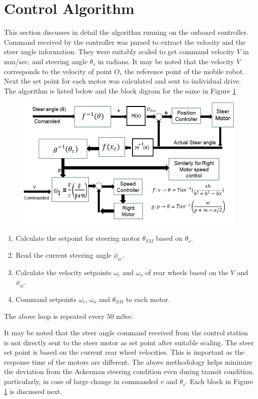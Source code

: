 \section{Control Algorithm }
This section discusses in detail the algorithm running on the onboard controller.  Command received by the controller was parsed to extract the velocity  and the steer angle  information. They were suitably scaled to get command velocity  $V$ in mm/sec, and steering  angle $\theta_s$ in radians.  It may be noted that the velocity $V$ corresponds to the velocity of point $O_r$ the reference point of the mobile robot.  Next the set point for each motor was calculated  and sent to individual drive. The algorithm is listed below and the block digram for the same in Figure \ref{fig:ControlBlock}
\begin{figure}[h]
	\includegraphics[width=\linewidth,keepaspectratio]{Chapter5/fig/BlkDigLocal2}
	\label{fig:ControlBlock} 
\end{figure}

\begin{enumerate}
	\item Calculate the setpoint for steering motor $\theta_{SM} $ based on $\theta_s$.
	\item Read the current steering  angle $\phi_{ic}$.
	\item Calculate the velocity setpoints $\omega_{i}$ and $\omega_{o}$ of  rear wheels based on the $V$ and $\phi_{ic}$.

	
	\item Command  setpoints $\omega_{i}$, $\omega_{o}$ and $\theta_{SM} $ to each motor. 
\end{enumerate}
The above loop is repeated every 50 mSec.

It may be noted that the steer angle command received from the control station is not directly sent to the steer motor as set point after suitable scaling. The steer set point is based on the current rear wheel velocities. This is important as the response time of the  motors are different. The above methodology helps  minimize the deviation  from the Ackerman  steering condition even during transit condition, particularly, in case of large change in commanded $v$ and $\theta_s$. 
Each block in Figure \ref{fig:ControlBlock} is discussed next. 

